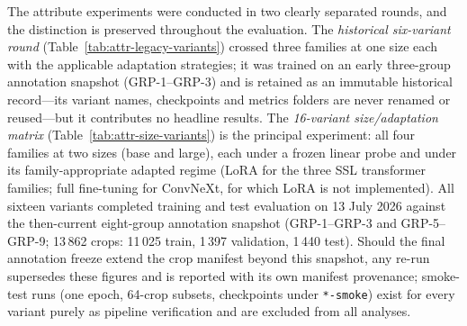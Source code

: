 The attribute experiments were conducted in two clearly separated rounds, and the distinction is preserved throughout the evaluation. The \emph{historical six-variant round} (Table~\ref{tab:attr-legacy-variants}) crossed three families at one size each with the applicable adaptation strategies; it was trained on an early three-group annotation snapshot (GRP-1--GRP-3) and is retained as an immutable historical record---its variant names, checkpoints and metrics folders are never renamed or reused---but it contributes no headline results. The \emph{16-variant size/adaptation matrix} (Table~\ref{tab:attr-size-variants}) is the principal experiment: all four families at two sizes (base and large), each under a frozen linear probe and under its family-appropriate adapted regime (LoRA for the three SSL transformer families; full fine-tuning for ConvNeXt, for which LoRA is not implemented). All sixteen variants completed training and test evaluation on 13 July 2026 against the then-current eight-group annotation snapshot (GRP-1--GRP-3 and GRP-5--GRP-9; 13\,862 crops: 11\,025 train, 1\,397 validation, 1\,440 test). Should the final annotation freeze extend the crop manifest beyond this snapshot, any re-run supersedes these figures and is reported with its own manifest provenance; smoke-test runs (one epoch, 64-crop subsets, checkpoints under \texttt{*-smoke}) exist for every variant purely as pipeline verification and are excluded from all analyses.

\begin{table}[htbp]
\centering
\caption{Historical six-variant round (GRP-1--GRP-3 snapshot; superseded by the 16-variant matrix). Parameter counts introspected at run time.}
\label{tab:attr-legacy-variants}
\small
{}
\end{table}

